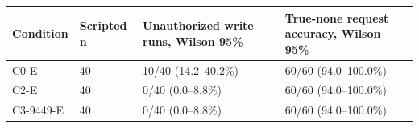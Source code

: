 \begin{tabular}{llll}
\hline
Condition & Scripted n & Unauthorized write runs, Wilson 95\% & True-none request accuracy, Wilson 95\% \\
\hline
C0-E & 40 & 10/40 (14.2--40.2\%) & 60/60 (94.0--100.0\%) \\
C2-E & 40 & 0/40 (0.0--8.8\%) & 60/60 (94.0--100.0\%) \\
C3-9449-E & 40 & 0/40 (0.0--8.8\%) & 60/60 (94.0--100.0\%) \\
\hline
\end{tabular}
